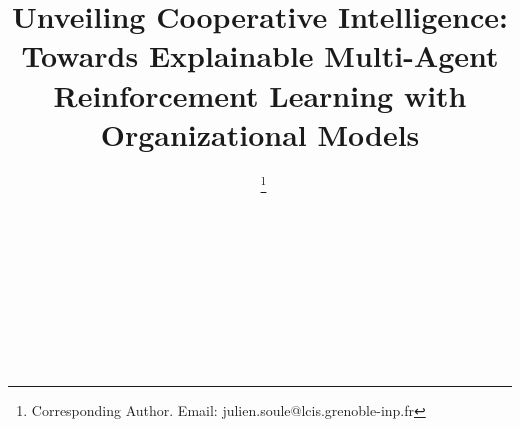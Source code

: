 \documentclass{ecai}
\begin{document}

\begin{frontmatter}




    \title{Unveiling Cooperative Intelligence: Towards Explainable Multi-Agent Reinforcement Learning with Organizational Models}



    \author[A,B]{~\thanks{Corresponding Author. Email: julien.soule@lcis.grenoble-inp.fr}}
    \author[A]{~}
    \author[A]{~}
    \author[B]{~}
    \author[C]{~}

    \address[A]{Univ. Grenoble Alpes, Grenoble INP, LCIS, 26000, Valence, France}
    \address[B]{Thales Land and Air Systems, BL IAS, Rennes, France}
    \address[C]{AICA IWG, La Guillermie, France}



\end{frontmatter}
\end{document}

